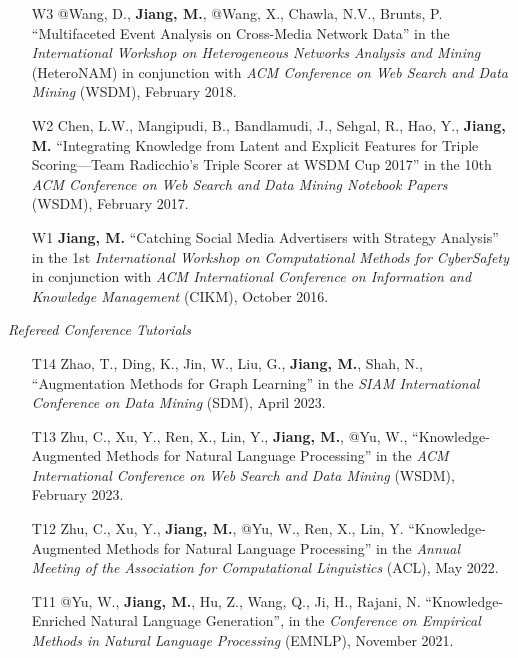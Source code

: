 \documentclass[10pt]{article}
\newenvironment{myindentpar}[1]%
{\begin{list}{}%
         {\setlength{\leftmargin}{#1}}%
         \item[]%
}
{\end{list}}
\newcounter{list}
\begin{document}
\begin{myindentpar}{0.00cm}
\begin{enumerate}[leftmargin=.5cm]
\item[W3] @Wang, D., \textbf{Jiang, M.}, @Wang, X., Chawla, N.V., Brunts, P. ``Multifaceted Event Analysis on Cross-Media Network Data'' in the \textit{International Workshop on Heterogeneous Networks Analysis and Mining} (HeteroNAM) in conjunction with \textit{ACM Conference on Web Search and Data Mining} (WSDM), February 2018.

\item[W2] Chen, L.W., Mangipudi, B., Bandlamudi, J., Sehgal, R., Hao, Y., \textbf{Jiang, M.} ``Integrating Knowledge from Latent and Explicit Features for Triple Scoring—Team Radicchio's Triple Scorer at WSDM Cup 2017'' in the 10th \textit{ACM Conference on Web Search and Data Mining Notebook Papers} (WSDM), February 2017.

\item[W1] \textbf{Jiang, M.} ``Catching Social Media Advertisers with Strategy Analysis'' in the 1st \textit{International Workshop on Computational Methods for CyberSafety} in conjunction with \textit{ACM International Conference on Information and Knowledge Management} (CIKM), October 2016.

\end{enumerate}

\hspace{-0.25cm}\textit{Refereed Conference Tutorials}

\begin{enumerate}[leftmargin=.5cm]

\item[T14] Zhao, T., Ding, K., Jin, W., Liu, G., \textbf{Jiang, M.}, Shah, N., ``Augmentation Methods for Graph Learning'' in the \textit{SIAM International Conference on Data Mining} (SDM), April 2023.
		
\item[T13] Zhu, C., Xu, Y., Ren, X., Lin, Y., \textbf{Jiang, M.}, @Yu, W., ``Knowledge-Augmented Methods for Natural Language Processing'' in the \textit{ACM International Conference on Web Search and Data Mining} (WSDM), February 2023.

\item[T12] Zhu, C., Xu, Y., \textbf{Jiang, M.}, @Yu, W., Ren, X., Lin, Y. ``Knowledge-Augmented Methods for Natural Language Processing'' in the \textit{Annual Meeting of the Association for Computational Linguistics} (ACL), May 2022.

\item[T11] @Yu, W., \textbf{Jiang, M.}, Hu, Z., Wang, Q., Ji, H., Rajani, N. ``Knowledge-Enriched Natural Language Generation'', in the \textit{Conference on Empirical Methods in Natural Language Processing} (EMNLP), November 2021.


\end{enumerate}
\end{myindentpar}
\end{document}
